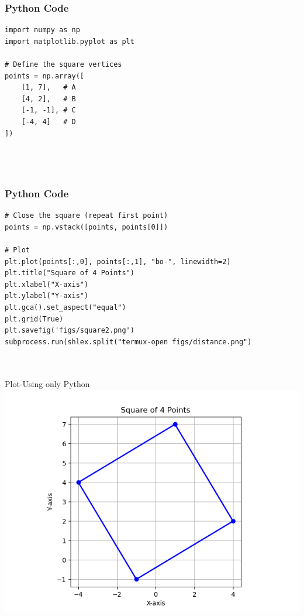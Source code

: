 \documentclass{beamer}
\begin{document}
\begin{frame}[fragile]
    \frametitle{Python Code}
    \begin{lstlisting}
import numpy as np
import matplotlib.pyplot as plt

# Define the square vertices
points = np.array([
    [1, 7],   # A
    [4, 2],   # B
    [-1, -1], # C
    [-4, 4]   # D
])




\end{lstlisting}
\end{frame}

\begin{frame}[fragile]
    \frametitle{Python Code }
    \begin{lstlisting}
# Close the square (repeat first point)
points = np.vstack([points, points[0]])

# Plot
plt.plot(points[:,0], points[:,1], "bo-", linewidth=2)
plt.title("Square of 4 Points")
plt.xlabel("X-axis")
plt.ylabel("Y-axis")
plt.gca().set_aspect("equal")
plt.grid(True)
plt.savefig('figs/square2.png')
subprocess.run(shlex.split("termux-open figs/distance.png")



\end{lstlisting}
\end{frame}





\begin{frame}{Plot-Using only Python}
    \centering
    \includegraphics[width=\columnwidth, height=0.8\textheight, keepaspectratio]{figs/square2.png}     
\end{frame}
\end{document}
